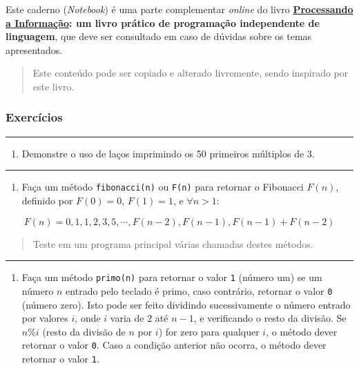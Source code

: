 \documentclass[12pt,a4paper]{article}
\renewcommand{\linethickness}{0.05em}
\providecommand{\tightlist}{%
      \setlength{\itemsep}{0pt}\setlength{\parskip}{0pt}}
\begin{document}
Este caderno (\emph{Notebook}) é uma parte complementar \emph{online} do
livro
\textbf{\href{https://editora.ufabc.edu.br/matematica-e-ciencias-da-computacao/58-processando-a-informacao}{Processando
a Informação}: um livro prático de programação independente de
linguagem}, que deve ser consultado em caso de dúvidas sobre os temas
apresentados.

\begin{quote}
Este conteúdo pode ser copiado e alterado livremente, sendo inspirado
por este livro.
\end{quote}

    \hypertarget{exercuxedcios}{%
\subsubsection{Exercícios}\label{exercuxedcios}}

    \begin{center}\rule{0.5\linewidth}{\linethickness}\end{center}

\begin{enumerate}
\def\labelenumi{\arabic{enumi}.}
\tightlist
\item
  Demonstre o uso de laços imprimindo os 50 primeiros múltiplos de 3.
\end{enumerate}

    \begin{center}\rule{0.5\linewidth}{\linethickness}\end{center}

\begin{enumerate}
\def\labelenumi{\arabic{enumi}.}
\setcounter{enumi}{1}
\tightlist
\item
  Faça um método \texttt{fibonacci(n)} ou \texttt{F(n)} para retornar o
  Fibonacci \(F(n)\), definido por \(F(0)=0\), \(F(1)=1\), e
  \(\forall n>1\):
\end{enumerate}

\[F(n) = 0, 1, 1, 2, 3, 5, \cdots, F(n-2), F(n-1), F(n-1) + F(n-2) \]

\begin{quote}
Teste em um programa principal várias chamadas destes métodos.
\end{quote}

    \begin{center}\rule{0.5\linewidth}{\linethickness}\end{center}

\begin{enumerate}
\def\labelenumi{\arabic{enumi}.}
\setcounter{enumi}{2}
\tightlist
\item
  Faça um método \texttt{primo(n)} para retornar o valor \texttt{1}
  (número um) se um número \(n\) entrado pelo teclado é primo, caso
  contrário, retornar o valor \texttt{0} (número zero). Isto pode ser
  feito dividindo sucessivamente o número entrado por valores \(i\),
  onde \(i\) varia de \(2\) até \(n-1\), e verificando o resto da
  divisão. Se \(n\%i\) (resto da divisão de \(n\) por \(i\)) for zero
  para qualquer \(i\), o método dever retornar o valor \texttt{0}. Caso
  a condição anterior não ocorra, o método dever retornar o valor
  \texttt{1}.
\end{enumerate}
\end{document}
